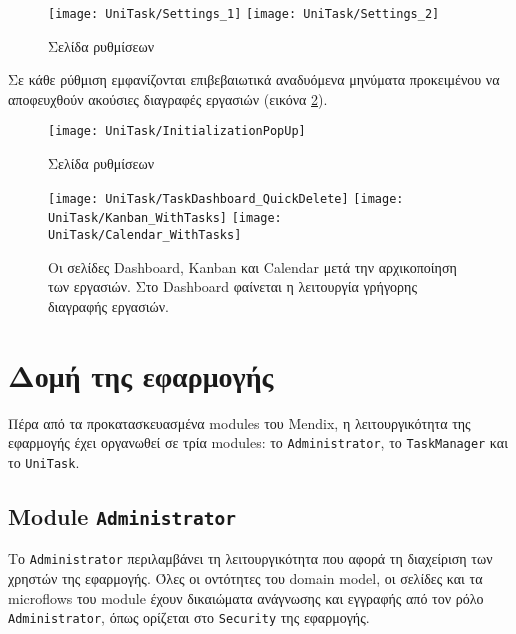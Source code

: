         \begin{figure}[h!] \noindent \centering
            \texttt{[image: UniTask/Settings\_1]}
            \texttt{[image: UniTask/Settings\_2]}
            \caption{\centering Σελίδα ρυθμίσεων}
            \label{fig:unitask_Settings}
        \end{figure}

        Σε κάθε ρύθμιση εμφανίζονται επιβεβαιωτικά αναδυόμενα μηνύματα προκειμένου να αποφευχθούν ακούσιες διαγραφές εργασιών (εικόνα \ref{fig:unitask_InitializationPopUp}).

        \begin{figure}[h!] \noindent \centering
            \texttt{[image: UniTask/InitializationPopUp]}
            \caption{\centering Σελίδα ρυθμίσεων}
            \label{fig:unitask_InitializationPopUp}
        \end{figure}

        \begin{figure}[p!] \noindent \centering
            \texttt{[image: UniTask/TaskDashboard\_QuickDelete]}
            \texttt{[image: UniTask/Kanban\_WithTasks]}
            \texttt{[image: UniTask/Calendar\_WithTasks]}
            \caption{\centering Οι σελίδες Dashboard, Kanban και Calendar μετά την αρχικοποίηση των εργασιών. Στο Dashboard φαίνεται η λειτουργία γρήγορης διαγραφής εργασιών.}
            \label{fig:unitask_Dashboard_Kanban_Calendar_WithTasks}
        \end{figure}

    \section{Δομή της εφαρμογής} \label{sec:unitask_mendix}
        Πέρα από τα προκατασκευασμένα modules του Mendix, η λειτουργικότητα της εφαρμογής έχει οργανωθεί σε τρία modules: το \texttt{Administrator}, το \texttt{TaskManager} και το \texttt{UniTask}.

        \subsection{Module \texttt{Administrator}}
            Το \texttt{Administrator} περιλαμβάνει τη λειτουργικότητα που αφορά τη διαχείριση των χρηστών της εφαρμογής. Όλες οι οντότητες του domain model, οι σελίδες και τα microflows του module έχουν δικαιώματα ανάγνωσης και εγγραφής από τον ρόλο \texttt{Administrator}, όπως ορίζεται στο \texttt{Security} της εφαρμογής.

